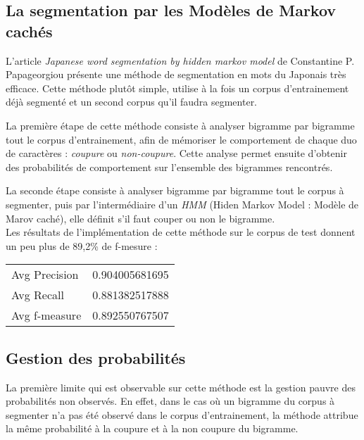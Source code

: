 
\subsection{La segmentation par les Modèles de Markov cachés}

L'article \textit{Japanese word segmentation by hidden markov model} de Constantine P. Papageorgiou\cite{Papageorgiou:001} présente une méthode de segmentation en mots du Japonais très efficace. Cette méthode plutôt simple, utilise à la fois un corpus d'entrainement déjà segmenté et un second corpus qu'il faudra segmenter. 

La première étape de cette méthode consiste à analyser bigramme par bigramme tout le corpus d'entrainement, afin de mémoriser le comportement de chaque duo de caractères : \textit{coupure} ou \textit{non-coupure}. Cette analyse permet ensuite d'obtenir des probabilités de comportement sur l'ensemble des bigrammes rencontrés.

La seconde étape consiste à analyser bigramme par bigramme tout le corpus à segmenter, puis par l'intermédiaire d'un \textit{HMM} (Hiden Markov Model : Modèle de Marov caché), elle définit s'il faut couper ou non le bigramme.\\

Les résultats de l'implémentation de cette méthode sur le corpus de test donnent un peu plus de 89,2\% de f-mesure :
\begin{center}
	\begin{tabular}{|l c|}
	  	\hline
	  	Avg Precision & 0.904005681695 \\
		Avg Recall & 0.881382517888 \\
		Avg f-measure & 0.892550767507 \\
	  	\hline
	\end{tabular}
\end{center}


\subsection{Gestion des probabilités}

La première limite qui est observable sur cette méthode est la gestion pauvre des probabilités non observés. En effet, dans le cas où un bigramme du corpus à segmenter n'a pas été observé dans le corpus d'entrainement, la méthode attribue la même probabilité à la coupure et à la non coupure du bigramme. \\


